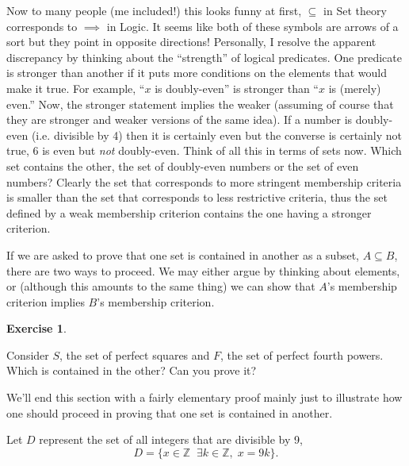 \documentclass[10pt,]{book}
\theoremstyle{plain}
\theoremstyle{definition}
\theoremstyle{definition}
\newtheorem{exercise}[theorem]{Exercise}
\numberwithin{equation}{section}
\newcommand{\suchthat}{\;  \;}
\newcommand{\Integers}{{\mathbb Z}}
\begin{document}
    Now to many people (me included!) this looks funny at first, \(\subseteq\)
    in Set theory corresponds to \(\implies\) in Logic. It seems like both
    of these symbols are arrows of a sort \textemdash{} but they point in opposite
    directions! Personally, I resolve the apparent discrepancy by thinking
    about the ``strength'' of logical predicates. One predicate is stronger
    than another if it puts more conditions on the elements that would make
    it true. For example, ``\(x\) is doubly-even'' is stronger than
    ``\(x\) is (merely) even.'' Now, the stronger statement implies the weaker
    (assuming of course that they are stronger and weaker versions of the
    same idea). If a number is doubly-even (i.e. divisible by 4) then it
    is certainly even \textemdash{} but the converse is certainly not true, \(6\) is even
    but \emph{not} doubly-even. Think of all this in terms of sets now.
    Which set contains the other, the set of doubly-even numbers or the set
    of even numbers? Clearly the set that corresponds to more stringent
    membership criteria is smaller than the set that corresponds
    to less restrictive criteria, thus the set defined by a weak membership
    criterion contains the one having a stronger criterion.
\par

    If we are asked to prove that one set is contained in another as a subset,
    \(A \subseteq B\), there are two ways to proceed. We may either argue by
    thinking about elements, or (although this amounts to the same thing)
    we can show that \(A\)'s membership criterion
    implies \(B\)'s membership criterion.
\begin{exercise}\label{exercise-34}

        Consider \(S\), the set of perfect squares and \(F\), the set of perfect fourth
        powers. Which is contained in the other? Can you prove it?
\end{exercise}
\par

    We'll end this section with a fairly elementary proof \textemdash{} mainly just to
    illustrate how one should proceed in proving that one set is contained in
    another.
\par

    Let \(D\) represent the set of all integers that are divisible by 9,
    \begin{equation*}
      D = \{ x \in \Integers \suchthat \exists k \in \Integers, \; x=9k \}.
    \end{equation*}
\par
\end{document}
